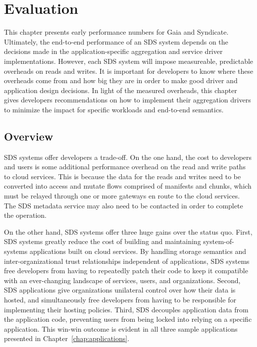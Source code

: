 \chapter{Evaluation}
\label{chap:evaluation}

This chapter presents early performance numbers for Gaia and Syndicate.
Ultimately, the end-to-end performance of an SDS system depends on the decisions
made in the application-specific aggregation and service driver implementations.
 However, each SDS system will impose measureable, predictable overheads on
reads and writes.  It is important for developers to know where these overheads
come from and how big they are in order to make good driver and application design decisions.
In light of the measured overheads, this chapter gives developers
recommendations on how to implement their aggregation drivers to minimize the
impact for specific workloads and end-to-end semantics.

\section{Overview}

SDS systems offer developers a trade-off.  On the one hand, the cost to
developers and users is some additional performance overhead on the read and write paths to cloud services.
This is because the data for the reads and writes need to be converted
into access and mutate flows comprised of manifests and chunks, which must be
relayed through one or more gateways en route to the cloud services.
The SDS metadata service may also need to be contacted in order to
complete the operation.

On the other hand, SDS systems offer three huge gains over the status quo.
First, SDS systems greatly reduce the cost of building and maintaining
system-of-systems applications built on cloud services.  By handling storage
semantics and inter-organizational trust relationships
independent of applications, SDS systems free developers from having to
repeatedly patch their code to keep it compatible with an ever-changing
landscape of services, users, and organizations.  Second, SDS applications
give organizations unilateral control over how
their data is hosted, and simultaneously free developers from having to be
responsible for implementing their hosting policies.
Third, SDS decouples application data from the application
code, preventing users from being locked into relying on a specific
application.  This win-win outcome is evident in all three
sample applications presented in Chapter~\ref{chap:applications}.

